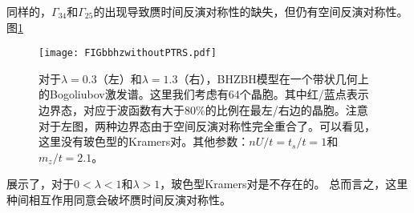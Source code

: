 同样的，$\Gamma_{34}$和$\Gamma_{25}$的出现导致赝时间反演对称性的缺失，但仍有空间反演对称性。
图\ref{BHZBHwithoutPTRS}%
\begin{figure}
	\texttt{[image: FIGbbhzwithoutPTRS.pdf]}
	\caption{\label{BHZBHwithoutPTRS}对于$\lambda=0.3$（左）和$\lambda=1.3$（右），BHZBH模型在一个带状几何上的Bogoliubov激发谱。这里我们考虑有$64$个晶胞。其中红/蓝点表示边界态，对应于波函数有大于$80\%$的比例在最左/右边的晶胞。注意对于左图，两种边界态由于空间反演对称性完全重合了。可以看见，这里没有玻色型的Kramers对。其他参数：$nU/t=t_s/t=1$和$m_z/t=2.1$。}
\end{figure}
展示了，对于$0<\lambda<1$和$\lambda>1$，玻色型Kramers对是不存在的。
总而言之，这里种间相互作用同意会破坏赝时间反演对称性。








